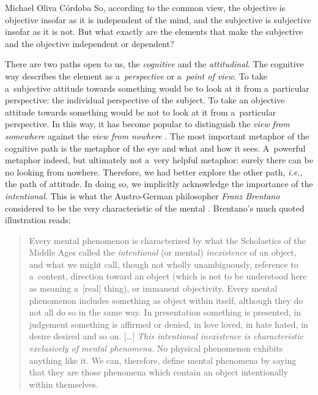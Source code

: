 \begin{artengenv}{Michael Oliva Córdoba}
So, according to the common view, the objective is objective insofar as it is independent of the mind, and the subjective is subjective insofar as it is not. But what exactly are the elements that make the subjective and the objective independent or dependent?



There are two paths open to us, the \textit{cognitive} and the \textit{attitudinal}. The cognitive way describes the element as a~\textit{perspective} or a~\textit{point of view}. To take a~subjective attitude towards something would be to look at it from a~particular perspective: the individual perspective of the subject. To take an objective attitude towards something would be not to look at it from a~particular perspective. In this way, it has become popular to distinguish the \textit{view from somewhere} against the \textit{view from nowhere} 
\parencite[cf.][]{nagel_subjective_1979}. %
 The most important metaphor of the cognitive path is the metaphor of the eye and what and how it sees. A~powerful metaphor indeed, but ultimately not a~very helpful metaphor: surely there can be no looking from nowhere. Therefore, we had better explore the other path, \textit{i.e.}, the path of attitude. In doing so, we implicitly acknowledge the importance of the \textit{intentional}. This is what the Austro-German philosopher \textit{Franz Brentano} considered to be the very characteristic of the mental 
\parencites[see, e.g.,][]{ohear_intentionality_1998}[][]{crane_elements_2001}[][]{crane_objects_2013}. %
 Brentano's much quoted illustration reads:



\begin{quote}
	Every mental phenomenon is characterized by what the Scholastics of the Middle Ages called the \textit{intentional} (or mental) \textit{inexistence} of an object, and what we might call, though not wholly unambiguously, reference to a~content, direction toward an object (which is not to be understood here as meaning a~[real] thing), or immanent objectivity. Every mental phenomenon includes something as object within itself, although they do not all do so in the same way. In presentation something is presented, in judgement something is affirmed or denied, in love loved, in hate hated, in desire desired and so on. […] \textit{This intentional inexistence is characteristic exclusively of mental phenomena.} No physical phenomenon exhibits anything like it. We can, therefore, define mental phenomena by saying that they are those phenomena which contain an object intentionally within themselves. 
	\parencites[][p.68]{brentano_psychology_2009}[orig.][emphasis added]{brentano_psychologie_1874}%
\end{quote}




\end{artengenv}
